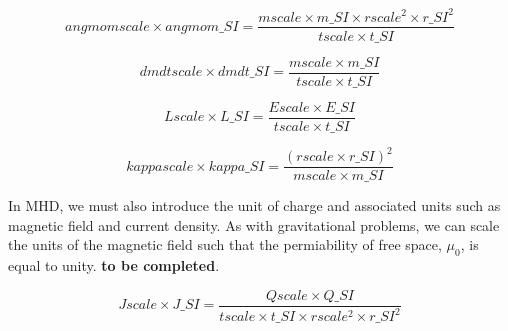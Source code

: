 \documentclass[a4paper]{article}
\begin{document}
\begin{equation}
angmomscale \times angmom\_SI = \frac{mscale \times m\_SI \times rscale^2 \times r\_SI^2}{tscale \times t\_SI}
\end{equation}
 
\begin{equation}
dmdtscale \times dmdt\_SI = \frac{mscale \times m\_SI}{tscale \times t\_SI}
\end{equation}

\begin{equation}
Lscale \times L\_SI = \frac{Escale \times E\_SI}{tscale \times t\_SI}
\end{equation}

\begin{equation}
kappascale \times kappa\_SI = \frac{\left(rscale \times r\_SI \right)^2}{mscale \times m\_SI}
\end{equation}

In MHD, we must also introduce the unit of charge and associated units such as magnetic field and current density.  As with gravitational problems, we can scale the units of the magnetic field such that the permiability of free space, $\mu_{0}$, is equal to unity.  {\bf to be completed}.

\begin{equation}
Jscale \times J\_SI = \frac{Qscale \times Q\_SI}
{tscale \times t\_SI \times rscale^2 \times r\_SI^2}
\end{equation}
\newline
\end{document}
